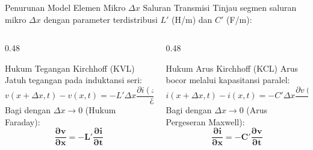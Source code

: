 \documentclass[aspectratio=169,10pt]{beamer}
\begin{document}
\begin{frame}{Penurunan Model Elemen Mikro $\Delta x$ Saluran Transmisi}
  Tinjau segmen saluran mikro $\Delta x$ dengan parameter terdistribusi $L'$ (H/m) dan $C'$ (F/m):
  \vspace{0.1cm}
  \begin{columns}[t]
    \begin{column}{0.48\textwidth}
      \begin{block}{Hukum Tegangan Kirchhoff (KVL)}
        \small
        Jatuh tegangan pada induktansi seri:
        \begin{equation*}
          v(x+\Delta x, t) - v(x, t) = -L' \Delta x \frac{\partial i(x, t)}{\partial t}
        \end{equation*}
        Bagi dengan $\Delta x \to 0$ (Hukum Faraday):
        \begin{equation*}
          \mathbf{\frac{\partial v}{\partial x} = -L' \frac{\partial i}{\partial t}}
        \end{equation*}
      \end{block}
    \end{column}
    \begin{column}{0.48\textwidth}
      \begin{alertblock}{Hukum Arus Kirchhoff (KCL)}
        \small
        Arus bocor melalui kapasitansi paralel:
        \begin{equation*}
          i(x+\Delta x, t) - i(x, t) = -C' \Delta x \frac{\partial v(x+\Delta x, t)}{\partial t}
        \end{equation*}
        Bagi dengan $\Delta x \to 0$ (Arus Pergeseran Maxwell):
        \begin{equation*}
          \mathbf{\frac{\partial i}{\partial x} = -C' \frac{\partial v}{\partial t}}
        \end{equation*}
      \end{alertblock}
    \end{column}
  \end{columns}
\end{frame}
\end{document}
